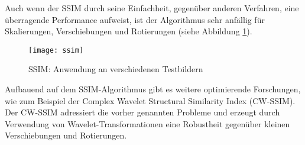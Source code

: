 Auch wenn der SSIM durch seine Einfachheit, gegenüber anderen Verfahren, eine
überragende Performance aufweist, ist der Algorithmus sehr anfällig für
Skalierungen, Verschiebungen und Rotierungen (siehe Abbildung \ref{fig:ssim}).
\parencite{ssim-quality-assessment}

\begin{figure}[H]
    \centering
    \texttt{[image: ssim]}
    \caption{SSIM: Anwendung an verschiedenen Testbildern}
    \label{fig:ssim}
\end{figure}

Aufbauend auf dem SSIM-Algorithmus gibt es weitere optimierende Forschungen, wie
zum Beispiel der Complex Wavelet Structural Similarity Index (CW-SSIM). Der
CW-SSIM adressiert die vorher genannten Probleme und erzeugt durch Verwendung
von Wavelet-Transformationen eine Robustheit gegenüber kleinen Verschiebungen
und Rotierungen. \parencite{ssim-complex-wavelet}
